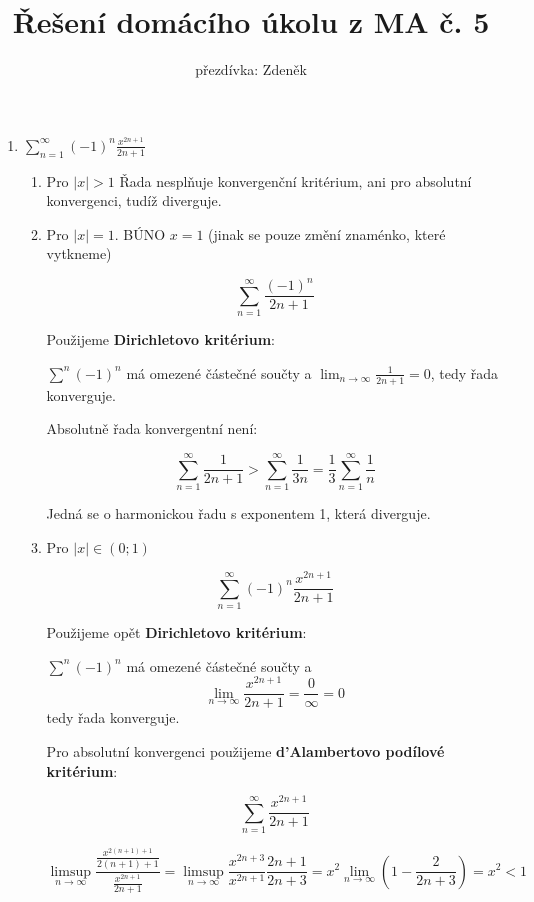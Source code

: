 \documentclass[10pt,a4paper]{article}
\title{Řešení domácího úkolu z MA č. 5}
\author{přezdívka: Zdeněk}
\date{}
\theoremstyle{plain}
\theoremstyle{definition}
\begin{document}
\maketitle

\section{}

\begin{enumerate}[label=(\alph*)]
\item $\sum_{n=1}^\infty (-1)^n \frac{x^{2n+1}}{
2n + 1}$

\begin{enumerate}[label=(\roman*)]
\item Pro $|x| > 1$ Řada nesplňuje konvergenční kritérium, ani pro absolutní konvergenci, tudíž diverguje.
\item Pro $|x| = 1$. BÚNO $x=1$ (jinak se pouze změní znaménko, které vytkneme)


\[\sum_{n=1}^\infty  \frac{(-1)^n}{2n + 1} \] 

Použijeme \textbf{Dirichletovo kritérium}: 
 
$\sum^n (-1)^n$ má omezené částečné součty a $\lim_{n \to \infty} \frac1{2n + 1} = 0$, tedy řada konverguje.

\hfill

Absolutně řada konvergentní není:

\[\sum_{n=1}^\infty  \frac{1}{2n + 1} > \sum_{n=1}^\infty  \frac{1}{3n} = \frac13 \sum_{n=1}^\infty  \frac{1}{n} \] 

Jedná se o harmonickou řadu s exponentem 1, která diverguje.

\item Pro $|x| \in (0;1)$

\[\sum_{n=1}^\infty  (-1)^n \frac{x^{2n+1}}{2n + 1}\]

Použijeme opět \textbf{Dirichletovo kritérium}:

$\sum^n (-1)^n$ má omezené částečné součty a
\[ \lim_{n \to \infty} \frac{x^{2n+1}}{2n + 1} = \frac0\infty = 0 \] 
 tedy řada konverguje.
 
\hfill
 
 Pro absolutní konvergenci použijeme \textbf{d'Alambertovo podílové kritérium}:
 
 \[\sum_{n=1}^\infty  \frac{x^{2n+1}}{2n + 1}\]
 
 \[\limsup_{n \to \infty} \frac{\frac{x^{2(n+1)+1}}{2(n+1) + 1}}{\frac{x^{2n+1}}{2n + 1}}
 = \limsup_{n \to \infty} \frac{x^{2n+3}}{x^{2n+1}} \frac{2n+1}{2n + 3} = x^2 \lim_{n \to \infty} (1 - \frac2{2n+3}) 
 = x^2 < 1\]
  

\end{enumerate}
\end{enumerate}
\end{document}
